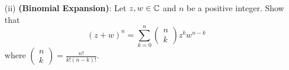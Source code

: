 \documentclass[a4paper]{article}
\begin{document}
\begin{enumerate}
\begin{proof}
                \end{proof}
            \item[(ii)] \textbf{(Binomial Expansion)}: Let \( z,w \in \mathbb{C}  \) and \( n  \) be a positive integer. Show that 
                \[  (z + w)^{n} = \sum_{ k=  0  }^{  n  } \begin{pmatrix} 
                           n \\
                           k 
                          \end{pmatrix} z^{k} w^{n-k}    \]
                          where \( \begin{pmatrix} 
                                     n \\
                                     k 
                                    \end{pmatrix}  = \frac{ n!  }{ k! (n-k)! }. \)
        \end{enumerate}
\end{document}
